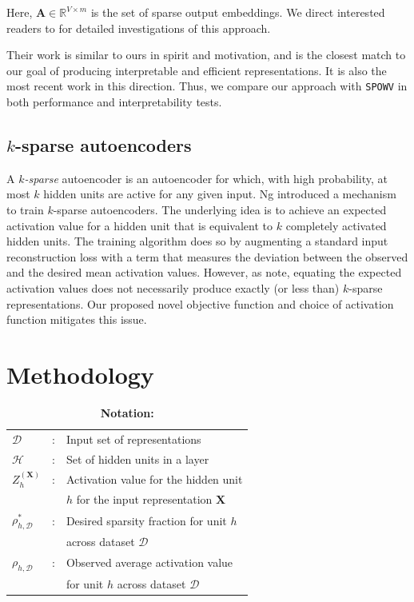 \documentclass[letterpaper]{article} %
\begin{document}
\noindent Here, $\mathbf{A} \in \mathbb{R}^{V \times m}$ is the set of sparse output embeddings. We direct interested readers to \cite{faruqui2015sparse,lee2007efficient} for detailed investigations of this approach.

Their work is similar to ours in spirit and motivation, and is the closest match to our goal of producing interpretable and efficient representations. It is also the most recent work in this direction. Thus, we compare our approach with \texttt{SPOWV} in both performance and interpretability tests.



\subsection*{$k$-sparse autoencoders}

A \emph{$k$-sparse} autoencoder \cite{ng2011sparse} is an autoencoder for which, with high probability, at most $k$ hidden units are active for any given input.
Ng  introduced a mechanism to train $k$-sparse autoencoders. The underlying idea is to achieve an expected activation value for a hidden unit that is equivalent to $k$ completely activated hidden units. The training algorithm does so by augmenting a standard input reconstruction loss with a term that measures the deviation between the observed and the desired mean activation values. However, as \cite{makhzani2013k} note, equating the expected activation values does not necessarily produce exactly (or less than) $k$-sparse representations. 
Our proposed novel objective function and choice of activation function mitigates this issue.




\section{Methodology}
\label{sec:approach}

\def\arraystretch{1.05}
\begin{table}[t]
  \centering
  \caption{\bf \large Notation:}
  \begin{tabular}{|lcl|}
    \hline
    $\mathcal{D}$ &: &Input set of representations \\[0.1em]
    $\mathcal{H}$ &: &Set of hidden units in a layer \\[0.1em]
    $Z_h^{(\mathbf{X})}$ &: &Activation value for the hidden unit\\
    && $h$ for the input representation $\mathbf{X}$ \\[0.1em]
    $\rho^*_{h,\mathcal{D}}$ &: &Desired sparsity fraction for unit $h$\\
    && across dataset $\mathcal{D}$\\[0.1em]
    $\rho_{h,\mathcal{D}}$ &: &Observed average activation value \\
    && for unit $h$ across dataset $\mathcal{D}$ \\ \hline
  \end{tabular}
\end{table}
\def\arraystretch{1}
\end{document}
